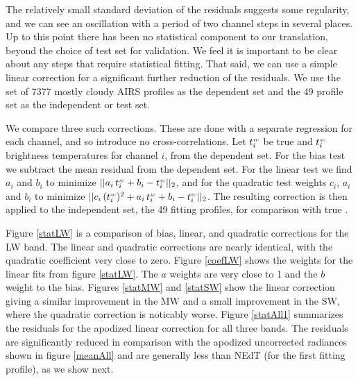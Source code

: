 \documentclass[journal]{IEEEtran}
\begin{document}


The relatively small standard deviation of the residuals suggests
some regularity, and we can see an oscillation with a period of two
channel steps in several places.  Up to this point there has been no
statistical component to our translation, beyond the choice of test
set for validation.  We feel it is important to be clear about any
steps that require statistical fitting.  That said, we can use a
simple linear correction for a significant further reduction of the
residuals.  We use the set of 7377 mostly cloudy AIRS profiles as
the dependent set and the 49 profile set as the independent or test
set.

We compare three such corrections.  These are done with a separate
regression for each {\cris} channel, and so introduce no
cross-correlations.  Let $t^{\mbox{\tiny\textsc{tc}}}_i$ be true {\cris} and $t^{\mbox{\tiny\textsc{ac}}}_i$
{\airs} {\cris} brightness temperatures for {\cris} channel $i$,
from the dependent set.  For the bias test we subtract the mean
residual from the dependent set.  For the linear test we find $a_i$
and $b_i$ to minimize $||a_i\,t^{\mbox{\tiny\textsc{ac}}}_i + b_i - t^{\mbox{\tiny\textsc{tc}}}_i||_2$, and for
the quadratic test weights $c_i$, $a_i$ and $b_i$ to minimize
$||c_i\,(t^{\mbox{\tiny\textsc{ac}}}_i)^2 + a_i\,t^{\mbox{\tiny\textsc{ac}}}_i + b_i - t^{\mbox{\tiny\textsc{tc}}}_i||_2$.  The resulting
correction is then applied to the independent set, the 49 fitting
profiles, for comparison with true {\cris}.

Figure \ref{statLW} is a comparison of bias, linear, and quadratic
corrections for the LW band.  The linear and quadratic corrections
are nearly identical, with the quadratic coefficient very close to
zero.  Figure \ref{coefLW} shows the weights for the linear fits
from figure \ref{statLW}.  The $a$ weights are very close to 1 and
the $b$ weight to the bias.  Figures \ref{statMW} and \ref{statSW}
show the linear correction giving a similar improvement in the MW
and a small improvement in the SW, where the quadratic correction is
noticably worse.  Figure \ref{statAll1} summarizes the residuals for
the apodized linear correction for all three bands.  The residuals
are significantly reduced in comparison with the apodized
uncorrected radiances shown in figure \ref{meanAll} and are
generally less than NEdT (for the first fitting profile), as we show
next.
\end{document}
